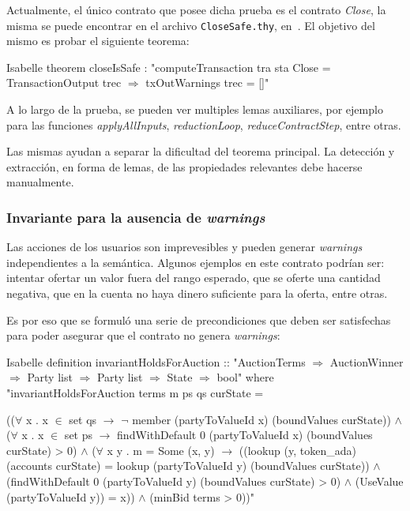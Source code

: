 \documentclass[12pt]{book}
\begin{document}
Actualmente, el único contrato que posee dicha prueba es el contrato \textit{Close}, la misma se puede encontrar en el archivo \texttt{CloseSafe.thy}, en~\cite{marlowe-isabelle-repo}. El objetivo del mismo es probar el siguiente teorema:

\begin{code}[title=Ausencia de \textit{warnings} para el contrato \texttt{Close} en sintaxis de Isabelle/HOL.]{Isabelle}
theorem closeIsSafe : "computeTransaction tra sta Close = TransactionOutput trec $\Longrightarrow$ txOutWarnings trec = []"
\end{code}

A lo largo de la prueba, se pueden ver multiples lemas auxiliares, por ejemplo para las funciones \textit{applyAllInputs}, \textit{reductionLoop}, \textit{reduceContractStep}, entre otras. 

Las mismas ayudan a separar la dificultad del teorema principal. La detección y extracción, en forma de lemas, de las propiedades relevantes debe hacerse manualmente.

\subsubsection{Invariante para la ausencia de \textit{warnings}}

Las acciones de los usuarios son imprevesibles y pueden generar \textit{warnings} independientes a la semántica. Algunos ejemplos en este contrato podrían ser: intentar ofertar un valor fuera del rango esperado, que se oferte una cantidad negativa, que en la cuenta no haya dinero suficiente para la oferta, entre otras.

Es por eso que se formuló una serie de precondiciones que deben ser satisfechas para poder asegurar que el contrato no genera \textit{warnings}:

\begin{code}[title=Invariante para el contrato \textit{Auction}.]{Isabelle}
definition invariantHoldsForAuction :: "AuctionTerms $\Rightarrow$ AuctionWinner $\Rightarrow$ Party list $\Rightarrow$ Party list $\Rightarrow$ State $\Rightarrow$ bool" where
"invariantHoldsForAuction terms m ps qs curState =

     (($\forall$ x . x $\in$ set qs $\longrightarrow$ $\neg$ member (partyToValueId x) (boundValues curState))
    $\land$ ($\forall$ x . x $\in$ set ps $\longrightarrow$ 
        findWithDefault 0 (partyToValueId x) (boundValues curState) > 0)
    $\land$ ($\forall$ x y . m = Some (x, y) $\longrightarrow$ ((lookup (y, token_ada) (accounts curState) = lookup (partyToValueId y) (boundValues curState))
            $\land$ (findWithDefault 0 (partyToValueId y) (boundValues curState) > 0)
            $\land$ (UseValue (partyToValueId y)) = x))
    $\land$ (minBid terms > 0))"
\end{code}
\end{document}
